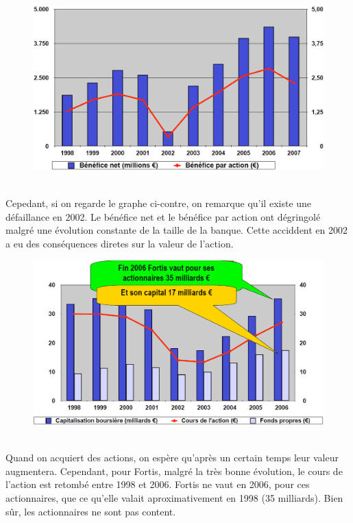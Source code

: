 \begin{figure}
\includegraphics[scale=0.3]{10}
\end{figure}
\ \\ Cepedant, si on regarde le graphe ci-contre, on remarque qu'il existe une défaillance en 2002. Le bénéfice net et le bénéfice par action ont dégringolé malgré une évolution constante de la taille de la banque. Cette acciddent en 2002 a eu des conséquences diretes sur la valeur de l'action. 

\begin{figure}
\includegraphics[scale=0.3]{11}
\end{figure}
\ \\ Quand on acquiert des actions, on espère qu'après un certain temps leur valeur augmentera. Cependant, pour Fortis, malgré la très bonne évolution, le cours de l'action est retombé entre 1998 et 2006. Fortis ne vaut en 2006, pour ces actionnaires, que ce qu'elle valait aproximativement en 1998 (35 milliards). Bien sûr, les actionnaires ne sont pas content. 

